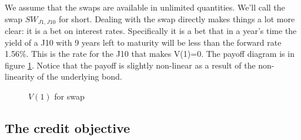



We assume that the swaps are available in unlimited quantities. We'll call the swap $SW_{J1,J10}$ for short. Dealing with the swap directly makes things a lot more clear: it is  a bet on interest rates. Specifically it is a bet that in a year's time the yield of a J10 with 9 years left to maturity will be less than the forward rate 1.56\%. This is the rate for the J10 that makes V(1)=0. The payoff diagram is in figure \ref{fig:swap}. Notice that the payoff is slightly non-linear as a result of the non-linearity of the underlying bond.

\begin{figure}[ht]
\centering


\caption{$V(1)$ for swap}
\label{fig:swap}
\end{figure}

\subsection{The credit objective}

